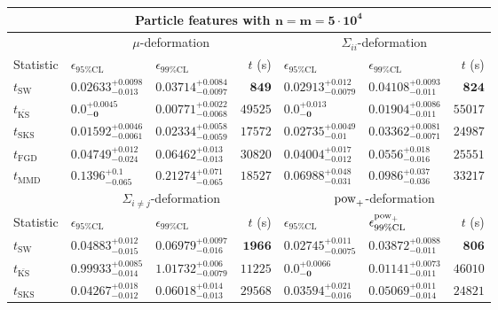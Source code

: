 \begin{tabular}{l|llr|llr}
	\toprule
	\multicolumn{7}{c}{{\bf Particle features with $\mathbf{n=m=5\cdot 10^{4}}$}} \\
	\toprule
	\multicolumn{1}{c}{} & \multicolumn{3}{c}{$\mu$-deformation} & \multicolumn{3}{c}{$\Sigma_{ii}$-deformation} \\
	Statistic & $\epsilon_{95\%\mathrm{CL}}$ & $\epsilon_{99\%\mathrm    {CL}}$ & $t$ (s) & $\epsilon_{95\%\mathrm{CL}}$ & $\epsilon_{99\%\mathrm{CL}}$ & $t$ (s) \\
	\midrule
	$t_{\mathrm{SW}}$ & $0.02633_{-0.013}^{+0.0098}$ & $0.03714_{-0.0097}^{+0.0084}$ & ${\mathbf{849}}$ & $0.02913_{-0.0079}^{+0.012}$ & $0.04108_{-0.011}^{+0.0093}$ & ${\mathbf{824}}$ \\
	$t_{\overline{\mathrm{KS}}}$ & ${\mathbf{0.0_{-0}^{+0.0045}}}$ & ${\mathbf{0.00771_{-0.0068}^{+0.0022}}}$ & $49525$ & ${\mathbf{0.0_{-0}^{+0.013}}}$ & ${\mathbf{0.01904_{-0.011}^{+0.0086}}}$ & $55017$ \\
	$t_{\mathrm{SKS}}$ & $0.01592_{-0.0061}^{+0.0046}$ & $0.02334_{-0.0059}^{+0.0058}$ & $17572$ & $0.02735_{-0.01}^{+0.0049}$ & $0.03362_{-0.0071}^{+0.0081}$ & $24987$ \\
	$t_{\mathrm{FGD}}$ & $0.04749_{-0.024}^{+0.012}$ & $0.06462_{-0.013}^{+0.013}$ & $30820$ & $0.04004_{-0.012}^{+0.017}$ & $0.0556_{-0.016}^{+0.018}$ & $25551$ \\
	$t_{\mathrm{MMD}}$ & $0.1396_{-0.065}^{+0.1}$ & $0.21274_{-0.065}^{+0.071}$ & $18527$ & $0.06988_{-0.031}^{+0.048}$ & $0.0986_{-0.036}^{+0.037}$ & $33217$ \\
	\toprule
	\multicolumn{1}{c}{} & \multicolumn{3}{c}{$\Sigma_{i\neq j}$-deformation} & \multicolumn{3}{c}{$\rm{pow}_{+}$-deformation} \\
	Statistic & $\epsilon_{95\%\mathrm{CL}}$ & $\epsilon_{99\%\mathrm{CL}}$ & $t$ (s) & $\epsilon_{95\%\mathrm{CL}}$ & $\epsilon^{\rm   {pow}_{+}}_{99\%\mathrm{CL}}$ & $t$ (s) \\
	\midrule
	$t_{\mathrm{SW}}$ & $0.04883_{-0.015}^{+0.012}$ & $0.06979_{-0.016}^{+0.0097}$ & ${\mathbf{1966}}$ & $0.02745_{-0.0075}^{+0.011}$ & $0.03872_{-0.011}^{+0.0088}$ & ${\mathbf{806}}$ \\
	$t_{\overline{\mathrm{KS}}}$ & $0.99933_{-0.014}^{+0.0085}$ & $1.01732_{-0.0079}^{+0.006}$ & $11225$ & ${\mathbf{0.0_{-0}^{+0.0066}}}$ & ${\mathbf{0.01141_{-0.011}^{+0.0073}}}$ & $46010$ \\
	$t_{\mathrm{SKS}}$ & $0.04267_{-0.012}^{+0.018}$ & $0.06018_{-0.013}^{+0.014}$ & $29568$ & $0.03594_{-0.016}^{+0.021}$ & $0.05069_{-0.014}^{+0.011}$ & $24821$ \\

\end{tabular}
